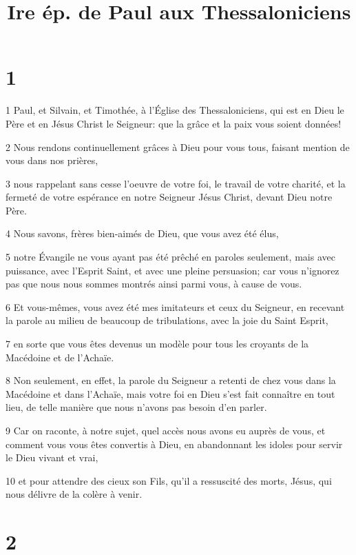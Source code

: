 

\title{Ire ép. de Paul aux Thessaloniciens}


\chapter{1}

\par 1 Paul, et Silvain, et Timothée, à l'Église des Thessaloniciens, qui est en Dieu le Père et en Jésus Christ le Seigneur: que la grâce et la paix vous soient données!
\par 2 Nous rendons continuellement grâces à Dieu pour vous tous, faisant mention de vous dans nos prières,
\par 3 nous rappelant sans cesse l'oeuvre de votre foi, le travail de votre charité, et la fermeté de votre espérance en notre Seigneur Jésus Christ, devant Dieu notre Père.
\par 4 Nous savons, frères bien-aimés de Dieu, que vous avez été élus,
\par 5 notre Évangile ne vous ayant pas été prêché en paroles seulement, mais avec puissance, avec l'Esprit Saint, et avec une pleine persuasion; car vous n'ignorez pas que nous nous sommes montrés ainsi parmi vous, à cause de vous.
\par 6 Et vous-mêmes, vous avez été mes imitateurs et ceux du Seigneur, en recevant la parole au milieu de beaucoup de tribulations, avec la joie du Saint Esprit,
\par 7 en sorte que vous êtes devenus un modèle pour tous les croyants de la Macédoine et de l'Achaïe.
\par 8 Non seulement, en effet, la parole du Seigneur a retenti de chez vous dans la Macédoine et dans l'Achaïe, mais votre foi en Dieu s'est fait connaître en tout lieu, de telle manière que nous n'avons pas besoin d'en parler.
\par 9 Car on raconte, à notre sujet, quel accès nous avons eu auprès de vous, et comment vous vous êtes convertis à Dieu, en abandonnant les idoles pour servir le Dieu vivant et vrai,
\par 10 et pour attendre des cieux son Fils, qu'il a ressuscité des morts, Jésus, qui nous délivre de la colère à venir.

\chapter{2}

